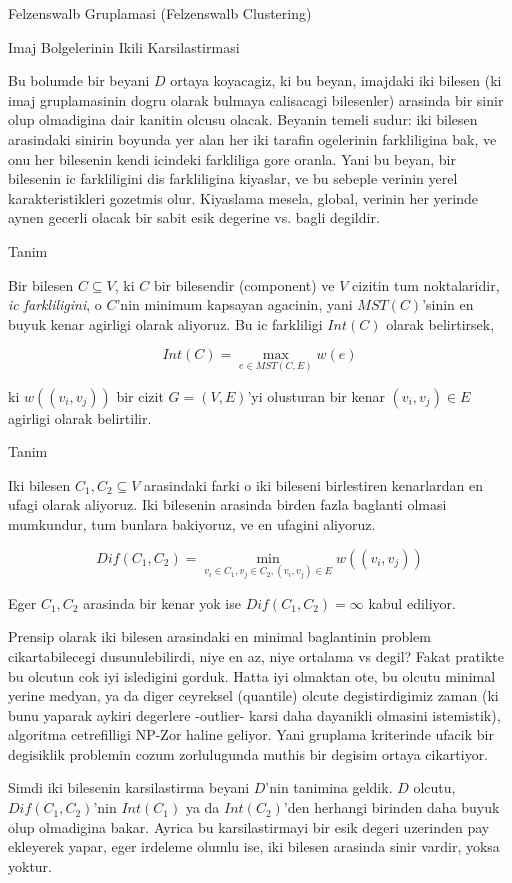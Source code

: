\documentclass[12pt,fleqn]{article}\usepackage{../common}
\begin{document}
Felzenswalb Gruplamasi (Felzenswalb Clustering)

Imaj Bolgelerinin Ikili Karsilastirmasi 

Bu bolumde bir beyani $D$ ortaya koyacagiz, ki bu beyan, imajdaki iki
bilesen (ki imaj gruplamasinin dogru olarak bulmaya calisacagi bilesenler)
arasinda bir sinir olup olmadigina dair kanitin olcusu olacak. Beyanin
temeli sudur: iki bilesen arasindaki sinirin boyunda yer alan her iki
tarafin ogelerinin farkliligina bak, ve onu her bilesenin kendi icindeki
farkliliga gore oranla. Yani bu beyan, bir bilesenin ic farkliligini dis
farkliligina kiyaslar, ve bu sebeple verinin yerel karakteristikleri
gozetmis olur. Kiyaslama mesela, global, verinin her yerinde aynen gecerli
olacak bir sabit esik degerine vs. bagli degildir.

Tanim

Bir bilesen $C \subseteq V$, ki $C$ bir bilesendir (component) ve $V$ cizitin tum
noktalaridir, {\em ic farkliligini}, o $C$'nin minimum kapsayan agacinin,
yani $MST(C)$'sinin en buyuk kenar agirligi olarak aliyoruz. Bu ic farkliligi
$Int(C)$ olarak belirtirsek, 

$$ Int(C) = \max_{e \in MST(C,E)} w(e) $$

ki $w((v_i , v_j))$ bir cizit $G = (V,E)$'yi olusturan bir kenar $(v_i,v_j)
\in E$ agirligi 
olarak belirtilir. 

Tanim

Iki bilesen $C_1,C_2 \subseteq V$ arasindaki farki o iki bileseni
birlestiren kenarlardan en ufagi olarak aliyoruz. Iki bilesenin arasinda
birden fazla baglanti olmasi mumkundur, tum bunlara bakiyoruz, ve en
ufagini aliyoruz.

$$ Dif(C_1,C_2) = \min_{v_i \in C_1, v_j \in C_2, (v_i,v_j) \in E} w((v_i,v_j))$$

Eger $C_1,C_2$ arasinda bir kenar yok ise $Dif(C_1,C_2) = \infty$ kabul
ediliyor. 

Prensip olarak iki bilesen arasindaki en minimal baglantinin problem
cikartabilecegi dusunulebilirdi, niye en az, niye ortalama vs degil? Fakat
pratikte bu olcutun cok iyi isledigini gorduk. Hatta iyi olmaktan ote, bu
olcutu minimal yerine medyan, ya da diger ceyreksel (quantile) olcute
degistirdigimiz zaman (ki bunu yaparak aykiri degerlere -outlier- karsi
daha dayanikli olmasini istemistik), algoritma cetrefilligi NP-Zor haline
geliyor. Yani gruplama kriterinde ufacik bir degisiklik problemin cozum
zorlulugunda muthis bir degisim ortaya cikartiyor. 

Simdi iki bilesenin karsilastirma beyani $D$'nin tanimina geldik. $D$ olcutu,
$Dif(C_1,C_2)$'nin $Int(C_1)$ ya da $Int(C_2)$'den herhangi birinden daha
buyuk olup olmadigina bakar. Ayrica bu karsilastirmayi bir esik degeri
uzerinden pay ekleyerek yapar, eger irdeleme olumlu ise, iki bilesen
arasinda sinir vardir, yoksa yoktur.
\end{document}
